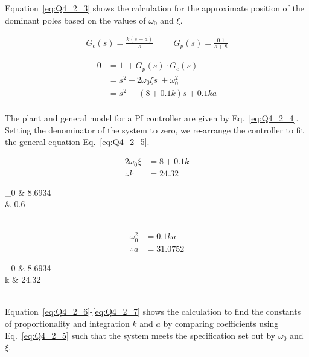 Equation~\eqref{eq:Q4_2_3} shows the calculation for the approximate position of the dominant poles based on the values of $\omega_0$ and $\xi$.

\begin{equation}
	\begin{split}
		G_{c}\left(s\right)=\frac{k\left(s+a\right)}{s} \hspace{1cm} G_{p}\left(s\right)=\frac{0.1}{s+8}
	\end{split}\label{eq:Q4_2_4}
\end{equation}

\begin{equation}
	\begin{split}
		0&=1\ +G_{p}\left(s\right)\cdot G_{c}\left(s\right)\\
		&=s^{2}+2\omega_{0}\xi s\ +\omega_{0}^{2}\\
		&=s^{2\ }+\left(8+0.1k\right)s+0.1ka\\
	\end{split}\label{eq:Q4_2_5}
\end{equation}

The plant and general model for a PI controller are given by Eq.~\eqref{eq:Q4_2_4}. Setting the denominator of the system to zero, we re-arrange the controller to fit the general equation Eq.~\eqref{eq:Q4_2_5}.

\begin{equation}
	\begin{split}
		2\omega_{0}\xi &= 8+0.1k\\
		\therefore k &= 24.32
	\end{split}\label{eq:Q4_2_6}
\end{equation}

\begin{conditions}
    \omega_0 & 8.6934 \\
    \xi & 0.6         \\
\end{conditions}\\

\begin{equation}
	\begin{split}
		\omega_{0}^{2} &= 0.1ka\\
		\therefore a &= 31.0752
	\end{split}\label{eq:Q4_2_7}
\end{equation}

\begin{conditions}
    \omega_0 & 8.6934 \\
    k & 24.32         \\
\end{conditions}\\
Equation~\eqref{eq:Q4_2_6}-\eqref{eq:Q4_2_7} shows the calculation to find the constants of proportionality and integration $k$ and $a$ by comparing coefficients using Eq.~\eqref{eq:Q4_2_5} such that the system meets the specification set out by $\omega_0$ and $\xi$.

